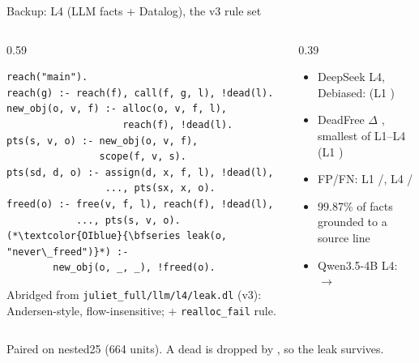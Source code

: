 \begin{frame}[fragile]{Backup: L4 (LLM facts + Datalog), the v3 rule set}
  \begin{columns}[T]
    \begin{column}{0.59\textwidth}
\begin{lstlisting}[style=dl]
reach("main").
reach(g) :- reach(f), call(f, g, l), !dead(l).
new_obj(o, v, f) :- alloc(o, v, f, l),
                    reach(f), !dead(l).
pts(s, v, o) :- new_obj(o, v, f),
                scope(f, v, s).
pts(sd, d, o) :- assign(d, x, f, l), !dead(l),
                 ..., pts(sx, x, o).
freed(o) :- free(v, f, l), reach(f), !dead(l),
            ..., pts(s, v, o).
(*\textcolor{OIblue}{\bfseries leak(o, "never\_freed")}*) :-
        new_obj(o, _, _), !freed(o).
\end{lstlisting}
      {\tiny Abridged from \texttt{juliet\_full/llm/l4/leak.dl} (v3): Andersen-style, flow-insensitive;
      + \texttt{realloc\_fail} rule.\par}
    \end{column}
    \begin{column}{0.39\textwidth}
      \begin{itemize}\small
        \item DeepSeek L4, Debiased:  (L1 )
        \item DeadFree $\Delta$ , smallest of L1--L4 (L1 )
        \item FP/FN: L1 /,
              L4 /
        \item 99.87\% of facts grounded to a source line
        \item Qwen3.5-4B L4:  $\to$ 
      \end{itemize}
    \end{column}
  \end{columns}
  \vfill
  {\scriptsize Paired on nested25 (664 units). A dead  is dropped by , so the leak survives.\par}
\end{frame}



